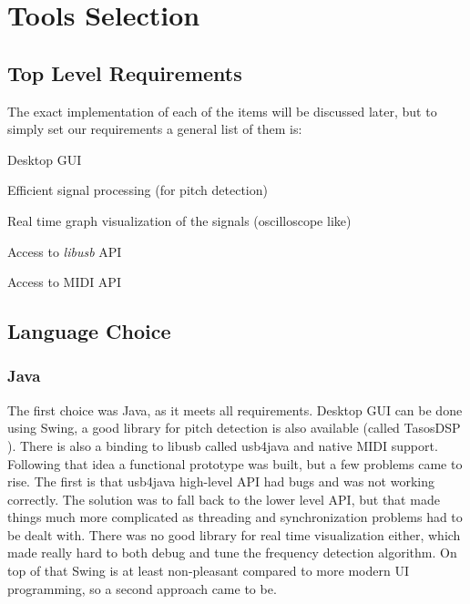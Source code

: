\section{Tools Selection}
\label{tools-selection}

\subsection{Top Level Requirements}
The exact implementation of each of the items will be discussed later, but to
simply set our requirements a general list of them is:

\begin{itemlist}
  \item Desktop GUI
  \item Efficient signal processing (for pitch detection)
  \item Real time graph visualization of the signals (oscilloscope like)
  \item Access to \textit{libusb} \cite{libusb} API
  \item Access to MIDI API
\end{itemlist}

\subsection{Language Choice}

\subsubsection{Java}
The first choice was Java, as it meets all requirements. Desktop GUI can be done
using Swing, a good library for pitch detection is also available (called TasosDSP \cite{TarsosDSP}).
There is also a binding to libusb called usb4java and native MIDI support. \\
Following that idea a functional prototype was built, but a few problems came to rise.
The first is that usb4java high-level API had bugs and was not working correctly.
The solution was to fall back to the lower level API, but that made things much
more complicated as threading and synchronization problems had to be dealt with.
There was no good library for
real time visualization either, which made really hard to both debug and tune the
frequency detection algorithm. On top of that Swing is at least non-pleasant
compared to more modern UI programming, so a second approach came to be.

